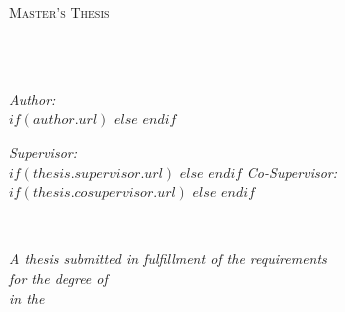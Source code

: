 \frontmatter %

\pagestyle{plain} %


\begin{titlepage}
\begin{center}

\vspace*{.06\textheight}
{\scshape\LARGE \univname\par}\vspace{1.5cm} %
\textsc{\Large Master's Thesis}\\[0.5cm] %

\HRule \\[0.4cm] %
{\huge \bfseries \ttitle\par}\vspace{0.4cm} %
\HRule \\[1.5cm] %
 
\begin{minipage}[t]{0.4\textwidth}
\begin{flushleft} \large
\emph{Author:}\\
$if(author.url)$
{\authorname}
$else$
\authorname
$endif$
\end{flushleft}
\end{minipage}
\begin{minipage}[t]{0.4\textwidth}
\begin{flushright} \large
\emph{Supervisor:} \\
$if(thesis.supervisor.url)$%
{\supname} 
$else$%
\supname
$endif$
\emph{Co-Supervisor:} \\
$if(thesis.cosupervisor.url)$%
{\cosupname} 
$else$%
\cosupname
$endif$
\end{flushright}
\end{minipage}\\[3cm]
 
\vfill

\large \textit{A thesis submitted in fulfillment of the requirements\\ for the degree of \degreename}\\[0.3cm] %
\textit{in the}\\[0.4cm]
\groupname\\
\deptname\\[2cm] %
 

\end{center}
\end{titlepage}
